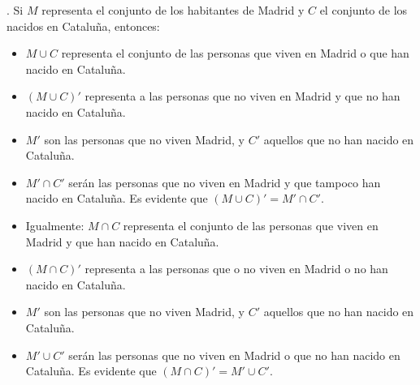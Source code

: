\begin{example}
	. Si $M$ representa el conjunto de los habitantes de Madrid y $C$ el conjunto de los nacidos en Cataluña, entonces: 

\begin{itemize}
	\vspace{-2mm} \item $M\cup C$  representa el conjunto de las personas que viven en Madrid o que han nacido en Cataluña. 

	\vspace{-2mm} \item $(M\cup C)'$ representa a las personas que no viven en Madrid y que no han nacido en Cataluña. 

	\vspace{-2mm} \item $M'$ son las personas que no viven Madrid, y $C'$ aquellos que no han nacido en Cataluña. 

	\vspace{-2mm} \item $M'\cap C'$ serán las personas que no viven en Madrid y que tampoco han nacido en Cataluña.  Es evidente que $(M\cup C)'=M'\cap C'$. 

	\vspace{-2mm} \item Igualmente: $M\cap C$ representa el conjunto de las personas que viven en Madrid y que han nacido en Cataluña. 

	\vspace{-2mm} \item $(M\cap C)'$ representa a las personas que o no viven en Madrid o no han nacido en Cataluña. 

	\vspace{-2mm} \item $M'$ son las personas que no viven Madrid, y $C'$  aquellos que no han nacido en Cataluña. 

	\vspace{-2mm} \item  $M'\cup C'$ serán las personas que no viven en Madrid o que no han nacido en Cataluña.  Es evidente que $(M\cap C)'=M'\cup C'$. 
\end{itemize}

\end{example}

